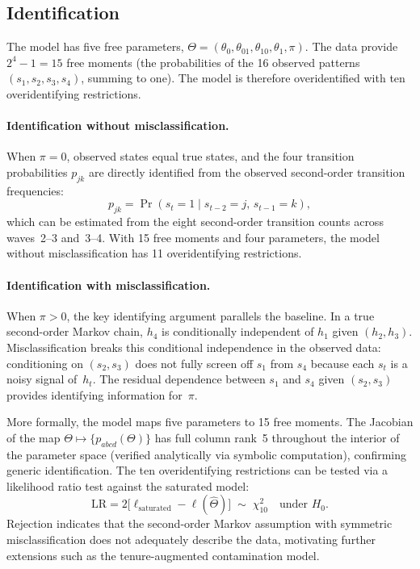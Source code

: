 \subsection{Identification}
\label{sec:ar2_identification}

The model has five free parameters,
$\Theta = (\theta_0, \theta_{01}, \theta_{10}, \theta_1, \pi)$.
The data provide $2^4 - 1 = 15$ free moments (the probabilities of the
16 observed patterns $(s_1, s_2, s_3, s_4)$, summing to one). The model
is therefore overidentified with ten overidentifying restrictions.

\paragraph{Identification without misclassification.}
When $\pi = 0$, observed states equal true states, and the four
transition probabilities $p_{jk}$ are directly identified from the
observed second-order transition frequencies:
\[
p_{jk} = \Pr(s_t = 1 \mid s_{t-2} = j,\, s_{t-1} = k),
\]
which can be estimated from the eight second-order transition counts
across waves~2--3 and~3--4. With 15 free moments and four parameters,
the model without misclassification has 11 overidentifying restrictions.

\paragraph{Identification with misclassification.}
When $\pi > 0$, the key identifying argument parallels the baseline.
In a true second-order Markov chain, $h_4$ is conditionally independent
of $h_1$ given $(h_2, h_3)$. Misclassification breaks this conditional
independence in the observed data: conditioning on $(s_2, s_3)$ does not
fully screen off $s_1$ from $s_4$ because each $s_t$ is a noisy signal
of~$h_t$. The residual dependence between $s_1$ and $s_4$ given
$(s_2, s_3)$ provides identifying information for~$\pi$.

More formally, the model maps five parameters to 15 free moments.
The Jacobian of the map
$\Theta \mapsto \{p_{abcd}(\Theta)\}$ has full column rank~5
throughout the interior of the parameter space (verified analytically
via symbolic computation), confirming generic identification. The ten
overidentifying restrictions can be tested via a likelihood ratio test
against the saturated model:
\begin{equation}
\mathrm{LR} = 2\big[\ell_{\mathrm{saturated}} - \ell(\hat\Theta)\big]
\;\sim\; \chi^2_{10} \quad \text{under } H_0.
\label{eq:ar2_overid_test}
\end{equation}
Rejection indicates that the second-order Markov assumption with
symmetric misclassification does not adequately describe the data,
motivating further extensions such as the tenure-augmented
contamination model.

